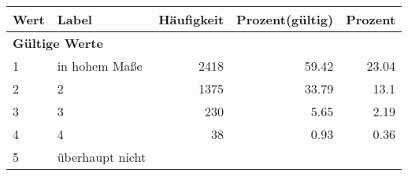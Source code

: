      \begin{longtable}{lXrrr}
     \toprule
     \textbf{Wert} & \textbf{Label} & \textbf{Häufigkeit} & \textbf{Prozent(gültig)} & \textbf{Prozent} \\
     \endhead
     \midrule
     \multicolumn{5}{l}{\textbf{Gültige Werte}}\\

     1 &
     \multicolumn{1}{X}{ in hohem Maße   } &


       \num{2418} &
       \num[round-mode=places,round-precision=2]{59.42} &
         \num[round-mode=places,round-precision=2]{23.04} \\

     2 &
     \multicolumn{1}{X}{ 2   } &


       \num{1375} &
       \num[round-mode=places,round-precision=2]{33.79} &
         \num[round-mode=places,round-precision=2]{13.1} \\

     3 &
     \multicolumn{1}{X}{ 3   } &


       \num{230} &
       \num[round-mode=places,round-precision=2]{5.65} &
         \num[round-mode=places,round-precision=2]{2.19} \\

     4 &
     \multicolumn{1}{X}{ 4   } &


       \num{38} &
       \num[round-mode=places,round-precision=2]{0.93} &
         \num[round-mode=places,round-precision=2]{0.36} \\

     5 &
     \multicolumn{1}{X}{ überhaupt nicht   } &



\end{longtable}
